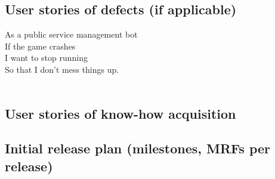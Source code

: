 \subsection{User stories of defects (if applicable)}

As a public service management bot\\
If the game crashes\\
I want to stop running\\
So that I don't mess things up.\\
\\


\subsection{User stories of know-how acquisition}
\subsection{Initial release plan (milestones, MRFs per release)}

\newpage
